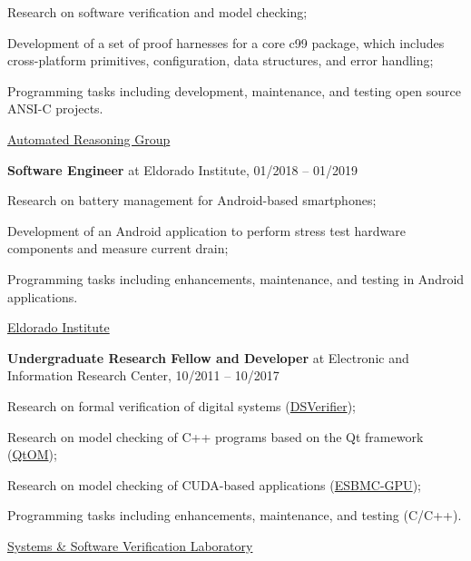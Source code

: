 \documentclass[letterpaper]{article}
\renewenvironment{itemize}{
  \begin{list}{}{
    \setlength{\leftmargin}{1.5em}
  }
}{
  \end{list}
}
\begin{document}
\begin{enumerate}
\begin{itemize}
        \item{\textendash} {Research on software verification and model checking;}
        \item{\textendash} {Development of a set of proof harnesses for a core c99 package, which includes cross-platform primitives, configuration, data structures, and error handling;}
        \item{\textendash} {Programming tasks including development, maintenance, and testing open source ANSI-C projects.}
        \item{\textendash} \href{https://aws.amazon.com/security/provable-security/?sc_channel=EL&sc_campaign=Promo_2018_vid&sc_medium=YouTube&sc_content=video3507&sc_detail=CAREERS&sc_country=US}{Automated Reasoning Group}
      \end{itemize}
         \item{{\bf Software Engineer} at Eldorado Institute, 01/2018 -- 01/2019}
      \begin{itemize}
        \item{\textendash} {Research on battery management for Android-based smartphones;}
        \item{\textendash} {Development of an Android application to perform stress test hardware components and measure current drain;}
        \item{\textendash} {Programming tasks including enhancements, maintenance, and testing in Android applications.}
        \item{\textendash} \href{http://eldorado.org.br/}{Eldorado Institute}
      \end{itemize}
     \item{{\bf Undergraduate Research Fellow and Developer} at Electronic and Information Research Center, 10/2011 -- 10/2017}
      \begin{itemize}
        \item{\textendash} {Research on formal verification of digital systems (\href{http://www.dsverifier.org/}{DSVerifier});}
        \item{\textendash} {Research on model checking of C++ programs based on the Qt framework (\href{http://www.esbmc/qtom/}{QtOM});}
        \item{\textendash} {Research on model checking of CUDA-based applications (\href{http://www.esbmc/gpu/}{ESBMC-GPU});}
        \item{\textendash} {Programming tasks including enhancements, maintenance, and testing (C/C++).}
        \item{\textendash} \href{https://ssvlab.github.io}{Systems \& Software Verification Laboratory}

\end{itemize}
\end{enumerate}
\end{document}

